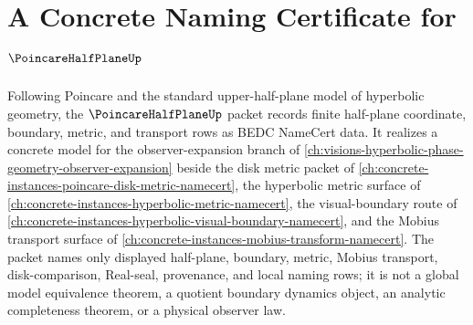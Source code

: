 \chapter{A Concrete Naming Certificate for $\PoincareHalfPlaneUp$}
\label{ch:concrete-instances-poincare-half-plane-namecert}

Following Poincare and the standard upper-half-plane model of hyperbolic geometry, the $\PoincareHalfPlaneUp$ packet records finite half-plane coordinate, boundary, metric, and transport rows as BEDC NameCert data. It realizes a concrete model for the observer-expansion branch of \autoref{ch:visions-hyperbolic-phase-geometry-observer-expansion} beside the disk metric packet of \autoref{ch:concrete-instances-poincare-disk-metric-namecert}, the hyperbolic metric surface of \autoref{ch:concrete-instances-hyperbolic-metric-namecert}, the visual-boundary route of \autoref{ch:concrete-instances-hyperbolic-visual-boundary-namecert}, and the Mobius transport surface of \autoref{ch:concrete-instances-mobius-transform-namecert}. The packet names only displayed half-plane, boundary, metric, Mobius transport, disk-comparison, Real-seal, provenance, and local naming rows; it is not a global model equivalence theorem, a quotient boundary dynamics object, an analytic completeness theorem, or a physical observer law.

